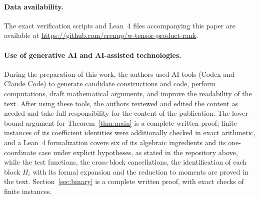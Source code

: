 \documentclass[10pt,a4paper]{article}
\theoremstyle{definition}
\begin{document}
\paragraph{Data availability.}
The exact verification scripts and Lean~4 files accompanying
this paper are available at
\url{https://github.com/erenup/w-tensor-product-rank}.

\paragraph{Use of generative AI and AI-assisted technologies.}
During the preparation of this work, the authors used AI tools (Codex and Claude Code) to generate candidate constructions and code, perform computations, draft mathematical arguments, and improve the readability of the text. After using these
tools, the authors reviewed and edited the content as needed and take full
responsibility for the content of the publication. The lower-bound argument for Theorem~\ref{thm:main} is a complete written proof; finite instances of its coefficient identities were additionally checked in exact arithmetic, and a Lean~4 formalization covers six of its algebraic ingredients and its one-coordinate case under explicit hypotheses, as stated in the repository above, while the test functions, the cross-block cancellations, the identification of each block $H_i$ with its formal expansion and the reduction to moments are proved in the text. Section~\ref{sec:binary} is a complete written proof, with exact checks of finite instances.

\small


\end{document}
